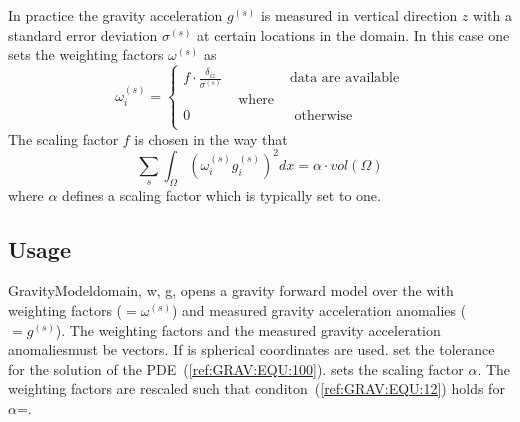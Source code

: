 In practice the gravity acceleration $g^{(s)}$ is measured in vertical
direction $z$ with a standard error deviation $\sigma^{(s)}$ at certain
locations in the domain.
In this case one sets the weighting factors $\omega^{(s)}$ as
\begin{equation}\label{ref:GRAV:EQU:11}
\omega^{(s)}_i 
= \left\{
\begin{array}{lcl}
f \cdot  \frac{\delta_{iz}}{\sigma^{(s)}} & & \mbox{data are available} \\
& \mbox{ where } & \\
0 & & \mbox{ otherwise } \\
\end{array}
\right.
\end{equation} 
The scaling factor $f$ is chosen in the way that
\begin{equation}\label{ref:GRAV:EQU:12}
\sum_{s} \int_{\Omega} ( \omega^{(s)}_i g^{(s)}_i ) ^2 dx =\alpha \cdot  vol(\Omega)
\end{equation} 
where $\alpha$ defines a scaling factor which is typically set to one.

\subsection{Usage}


\begin{classdesc}{GravityModel}{domain, 
w, g,
}
opens a gravity forward model over the \Domain {} with 
weighting factors  ($=\omega^{(s)}$) and measured gravity acceleration anomalies ($=g^{(s)}$).
The weighting factors and the  measured gravity acceleration anomalies\member must be vectors.
If  is \True spherical coordinates are used. 
 set the tolerance for the solution of the PDE~(\ref{ref:GRAV:EQU:100}).
 sets the scaling factor $\alpha$.
The weighting factors are rescaled such that conditon~(\ref{ref:GRAV:EQU:12}) holds for
$\alpha$=. 
\end{classdesc}

